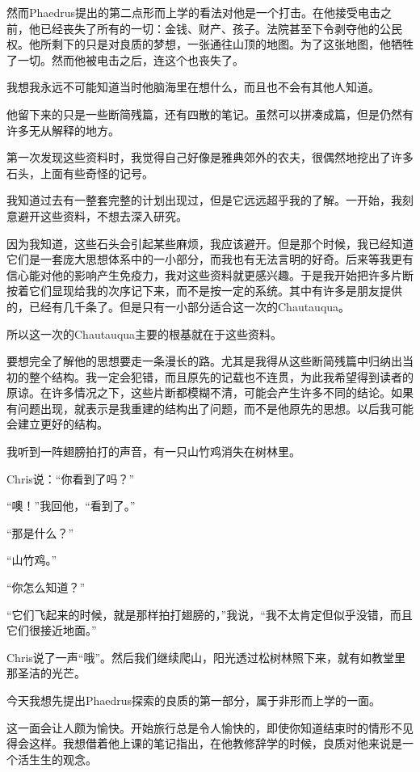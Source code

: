 \documentclass[UTF8]{article}
\begin{document}
\par 然而Phaedrus提出的第二点形而上学的看法对他是一个打击。在他接受电击之前，他已经丧失了所有的一切：金钱、财产、孩子。法院甚至下令剥夺他的公民权。他所剩下的只是对良质的梦想，一张通往山顶的地图。为了这张地图，他牺牲了一切。然而他被电击之后，连这个也丧失了。
\par 我想我永远不可能知道当时他脑海里在想什么，而且也不会有其他人知道。
\par 他留下来的只是一些断简残篇，还有四散的笔记。虽然可以拼凑成篇，但是仍然有许多无从解释的地方。
\par 第一次发现这些资料时，我觉得自己好像是雅典郊外的农夫，很偶然地挖出了许多石头，上面有些奇怪的记号。
\par 我知道过去有一整套完整的计划出现过，但是它远远超乎我的了解。一开始，我刻意避开这些资料，不想去深入研究。
\par 因为我知道，这些石头会引起某些麻烦，我应该避开。但是那个时候，我已经知道它们是一套庞大思想体系中的一小部分，而我也有无法言明的好奇。后来等我更有信心能对他的影响产生免疫力，我对这些资料就更感兴趣。于是我开始把许多片断按着它们显现给我的次序记下来，而不是按一定的系统。其中有许多是朋友提供的，已经有几千条了。但是只有一小部分适合这一次的Chautauqua。
\par 所以这一次的Chautauqua主要的根基就在于这些资料。
\par 要想完全了解他的思想要走一条漫长的路。尤其是我得从这些断简残篇中归纳出当初的整个结构。我一定会犯错，而且原先的记载也不连贯，为此我希望得到读者的原谅。在许多情况之下，这些片断都模糊不清，可能会产生许多不同的结论。如果有问题出现，就表示是我重建的结构出了问题，而不是他原先的思想。以后我可能会建立更好的结构。
\par 我听到一阵翅膀拍打的声音，有一只山竹鸡消失在树林里。
\par Chris说：“你看到了吗？”
\par “噢！”我回他，“看到了。”
\par “那是什么？”
\par “山竹鸡。”
\par “你怎么知道？”
\par “它们飞起来的时候，就是那样拍打翅膀的，”我说，“我不太肯定但似乎没错，而且它们很接近地面。”
\par Chris说了一声“哦”。然后我们继续爬山，阳光透过松树林照下来，就有如教堂里那圣洁的光芒。
\par 今天我想先提出Phaedrus探索的良质的第一部分，属于非形而上学的一面。
\par 这一面会让人颇为愉快。开始旅行总是令人愉快的，即使你知道结束时的情形不见得会这样。我想借着他上课的笔记指出，在他教修辞学的时候，良质对他来说是一个活生生的观念。
\end{document}
